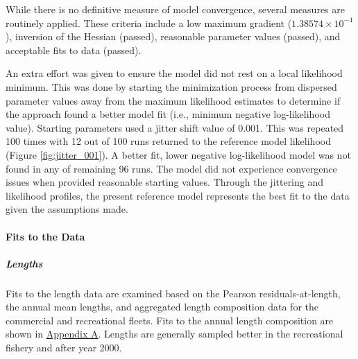 \documentclass[11pt,
  english,
  a4paper,
]{article}
\begin{document}
While there is no definitive measure of model convergence, several measures are routinely applied. These criteria include a low maximum gradient (\ensuremath{1.38574\times 10^{-4}}), inversion of the Hessian (passed), reasonable parameter values (passed), and acceptable fits to data (passed).

\leavevmode\tagmcend\tagstructend\par


An extra effort was given to ensure the model did not rest on a local likelihood minimum. This was done by starting the minimization process from dispersed parameter values away from the maximum likelihood estimates to determine if the approach found a better model fit (i.e., minimum negative log-likelihood value). Starting parameters used a jitter shift value of 0.001. This was repeated 100 times with 12 out of 100 runs returned to the reference model likelihood (Figure \ref{fig:jitter_001}). A better fit, lower negative log-likelihood model was not found in any of remaining 96 runs. The model did not experience convergence issues when provided reasonable starting values. Through the jittering and likelihood profiles, the present reference model represents the best fit to the data given the assumptions made.

\leavevmode\tagmcend\tagstructend\par


\hypertarget{fits-to-the-data}{%
\paragraph{Fits to the Data}\label{fits-to-the-data}}

\leavevmode\tagmcend\tagstructend


\hypertarget{lengths-2}{%
\subparagraph{Lengths}\label{lengths-2}}

\leavevmode\tagmcend\tagstructend


Fits to the length data are examined based on the Pearson residuals-at-length, the annual mean lengths, and aggregated length composition data for the commercial and recreational fleets. Fits to the annual length composition are shown in {\protect\hyperlink{app_a}{Appendix A}\leavevmode\tagmcend\tagstructend}. Lengths are generally sampled better in the recreational fishery and after year 2000.
\end{document}
